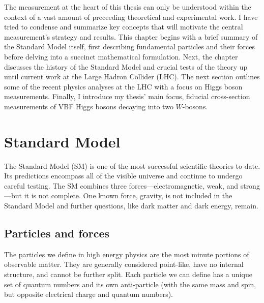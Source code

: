 The measurement at the heart of this thesis can only be understood within the context of a vast amount of preceeding theoretical and experimental work. I have tried to condense and summarize key concepts that will motivate the central measurement's strategy and results. This chapter begins with a brief summary of the Standard Model itself, first describing fundamental particles and their forces before delving into a succinct mathematical formulation. Next, the chapter discusses the history of the Standard Model and crucial tests of the theory up until current work at the Large Hadron Collider (LHC). The next section outlines some of the recent physics analyses at the LHC with a focus on Higgs boson measurements. Finally, I introduce my thesis' main focus, fiducial cross-section measurements of VBF Higgs bosons decaying into two $W$-bosons.

\section{Standard Model}

The Standard Model (SM) is one of the most successful scientific theories to date. Its predictions encompass all of the visible universe and continue to undergo careful testing. The SM combines three forces---electromagnetic, weak, and strong---but it is not complete. One known force, gravity, is not included in the Standard Model and further questions, like dark matter and dark energy, remain. 

\subsection{Particles and forces}
The particles we define in high energy physics are the most minute portions of observable matter. They are generally considered point-like, have no internal structure, and cannot be further split. Each particle we can define has a unique set of quantum numbers and its own anti-particle (with the same mass and spin, but opposite electrical charge and quantum numbers).

